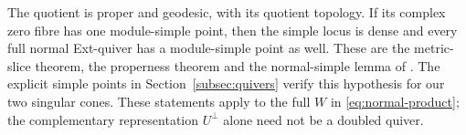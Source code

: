 The quotient is proper and geodesic, with its quotient
topology. If its complex zero fibre has one module-simple
point, then the simple locus is dense and every full normal
Ext-quiver has a module-simple point as well. These are the
metric-slice theorem, the properness theorem and the
normal-simple lemma of \cite{wuebben14}. The explicit simple
points in Section~\ref{subsec:quivers} verify this hypothesis
for our two singular cones. These statements apply to the
full $W$ in \eqref{eq:normal-product}; the complementary
representation $U^\perp$ alone need not be a doubled quiver.
